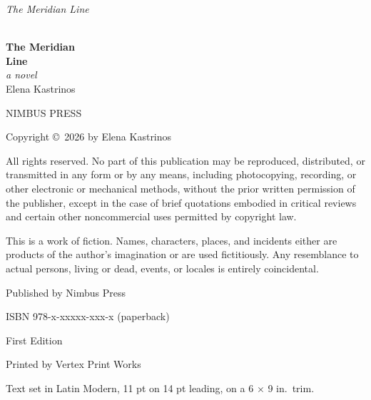 \documentclass[11pt,twoside]{book}
\begin{document}
\thispagestyle{empty}
\null
\vspace*{2.4in}
\begin{center}
{\fontsize{15}{18}\selectfont\itshape\color{softgray} The Meridian Line}
\end{center}
\clearpage

\thispagestyle{empty}
\null
\vspace*{1.3in}
\begin{center}
\\[0.5in]
{\fontsize{30}{34}\selectfont\bfseries\color{inkblack} The Meridian\\[0.1em] Line}\\[0.55in]
{\fontsize{13}{15}\selectfont\itshape\color{softgray} a novel}\\[1.4in]
{\fontsize{13}{16}\selectfont\color{inkblack} Elena Kastrinos}
\end{center}
\vfill
\begin{center}
{\fontsize{9}{11}\selectfont\color{softgray}\MakeUppercase{Nimbus Press}}
\end{center}
\vspace{0.35in}
\clearpage

\thispagestyle{empty}
\null
\vspace*{2.6in}
\begin{center}
\begin{minipage}{3.6in}
\fontsize{8.5}{11}\selectfont\color{softgray}
\raggedright
Copyright \copyright\ 2026 by Elena Kastrinos

\medskip
All rights reserved. No part of this publication may be reproduced, distributed, or transmitted in any form or by any means, including photocopying, recording, or other electronic or mechanical methods, without the prior written permission of the publisher, except in the case of brief quotations embodied in critical reviews and certain other noncommercial uses permitted by copyright law.

\medskip
This is a work of fiction. Names, characters, places, and incidents either are products of the author's imagination or are used fictitiously. Any resemblance to actual persons, living or dead, events, or locales is entirely coincidental.

\medskip
Published by Nimbus Press

\smallskip
ISBN 978-x-xxxxx-xxx-x (paperback)

\smallskip
First Edition

\smallskip
Printed by Vertex Print Works

\smallskip
Text set in Latin Modern, 11 pt on 14 pt leading, on a 6 \(\times\) 9 in.\ trim.
\end{minipage}
\end{center}
\clearpage
\end{document}
